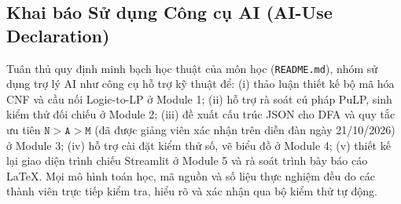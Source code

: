 \subsection{Khai báo Sử dụng Công cụ AI (AI-Use Declaration)}
Tuân thủ quy định minh bạch học thuật của môn học (\texttt{README.md}), nhóm sử dụng trợ lý AI như công cụ hỗ trợ kỹ thuật để: (i) thảo luận thiết kế bộ mã hóa CNF và cầu nối Logic-to-LP ở Module 1; (ii) hỗ trợ rà soát cú pháp PuLP, sinh kiểm thử đối chiếu ở Module 2; (iii) đề xuất cấu trúc JSON cho DFA và quy tắc ưu tiên $\texttt{N} > \texttt{A} > \texttt{M}$ (đã được giảng viên xác nhận trên diễn đàn ngày 21/10/2026) ở Module 3; (iv) hỗ trợ cài đặt kiểm thử số, vẽ biểu đồ ở Module 4; (v) thiết kế lại giao diện trình chiếu Streamlit ở Module 5 và rà soát trình bày báo cáo LaTeX. Mọi mô hình toán học, mã nguồn và số liệu thực nghiệm đều do các thành viên trực tiếp kiểm tra, hiểu rõ và xác nhận qua bộ kiểm thử tự động.